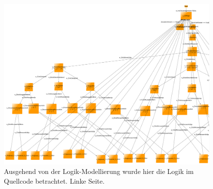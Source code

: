 \begin{figure}[p] \begin{leftfullpage}
\hspace*{-2.5cm}
\includegraphics[width=1.3\textwidth]{figures/modell_logisch_left.png}
\caption{Ausgehend von der Logik-Modellierung wurde hier die Logik im Quellcode betrachtet. Linke Seite.}
\label{fig:modell_logisch}
\end{leftfullpage} 
\end{figure} 
